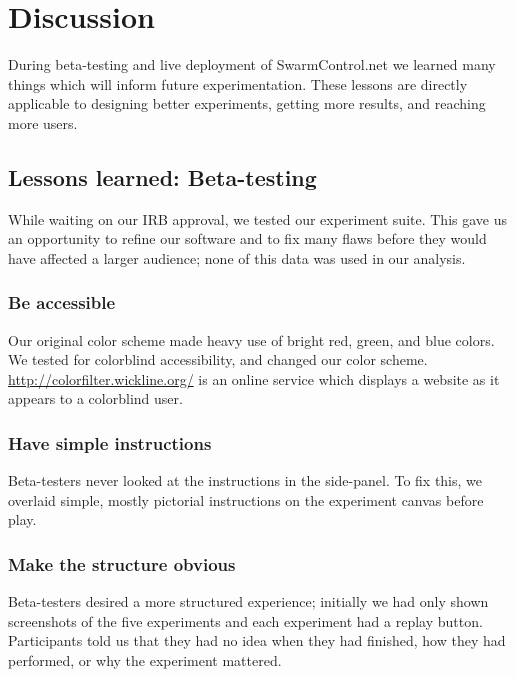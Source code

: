 \section{Discussion}\label{sec:discussion}

During beta-testing and live deployment of SwarmControl.net we learned many things which will inform future experimentation. These lessons are directly applicable to designing better experiments, getting more results, and reaching more users.

\subsection{Lessons learned: Beta-testing}

While waiting on our IRB approval, we tested our experiment suite.  This gave us an opportunity to refine our software and to fix many flaws before they would have affected a larger audience; none of this data was used in our analysis.

\subsubsection{Be accessible}

Our original color scheme made heavy use of bright red, green, and blue colors. We tested for colorblind accessibility, and changed our color scheme. \href{http://colorfilter.wickline.org/}{http://colorfilter.wickline.org/} is an online service which displays a website as it appears to a colorblind user.

\subsubsection{Have simple instructions}

Beta-testers never looked at the instructions in the side-panel. To fix this, we overlaid simple, mostly pictorial instructions on the experiment canvas before play.


\subsubsection{Make the structure obvious}

Beta-testers desired a more structured experience; initially we had only shown screenshots of the five experiments and each experiment had a replay button. Participants told us that they had no idea when they had finished, how they had performed, or why the experiment mattered.

